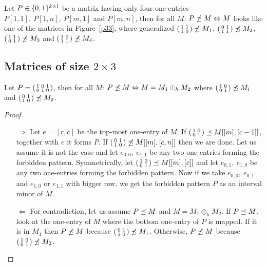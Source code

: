 \begin{thm}
Let $P\in\{0,1\}^{k\times l}$ be a matrix having only four one-entries -- $P[1,1],\ P[1,n],\ P[m,1]$ and $P[m,n]$, then for all $M$: $P\not\preceq M\Leftrightarrow M$ looks like one of the matrices in Figure~\ref{p33}, where generalized $\left(\begin{smallmatrix}1&1\\1&0\end{smallmatrix}\right)\not\preceq M_1$, $\left(\begin{smallmatrix}0&1\\1&1\end{smallmatrix}\right)\not\preceq M_2$, $\left(\begin{smallmatrix}1&1\\0&1\end{smallmatrix}\right)\not\preceq M_3$ and $\left(\begin{smallmatrix}1&0\\1&1\end{smallmatrix}\right)\not\preceq M_4$.
\end{thm}

\subsection{Matrices of size $2\times3$}
\begin{thm}
Let $P=\left(\begin{smallmatrix}1&0&1\\0&1&0\end{smallmatrix}\right)$, then for all $M$: $P\not\preceq M\Leftrightarrow M=M_1\oplus_hM_2$ where $\left(\begin{smallmatrix}1&0\\0&1\end{smallmatrix}\right)\not\preceq M_1$ and $\left(\begin{smallmatrix}0&1\\1&0\end{smallmatrix}\right)\not\preceq M_2$.
\end{thm}
\begin{proof}
\begin{itemize}
\item[$\Rightarrow$] Let $e=[r,c]$ be the top-most one-entry of $M$. If $\left(\begin{smallmatrix}1&0\\0&1\end{smallmatrix}\right)\preceq M[[m],[c-1]]$, together with $e$ it forms $P$. If $\left(\begin{smallmatrix}0&1\\1&0\end{smallmatrix}\right)\not\preceq M[[m],[c,n]]$ then we are done. Let us assume it is not the case and let $e_{0,0},\ e_{1,1}$ be any two one-entries forming the forbidden pattern. Symmetrically, let $\left(\begin{smallmatrix}1&0\\0&1\end{smallmatrix}\right)\preceq M[[m],[c]]$ and let $e_{0,1},\ e_{1,0}$ be any two one-entries forming the forbidden pattern. Now if we take $e_{0,0},\ e_{0,1}$ and $e_{1,0}$ or $e_{1,1}$ with bigger row, we get the forbidden pattern $P$ as an interval minor of $M$. 
\item[$\Leftarrow$] For contradiction, let us assume $P\preceq M$ and $M=M_1\oplus_hM_2$. If $P\preceq M$, look at the one-entry of $M$ where the bottom one-entry of $P$ is mapped. If it is in $M_1$ then $P\not\preceq M$ because $\left(\begin{smallmatrix}0&1\\1&0\end{smallmatrix}\right)\not\preceq M_1$. Otherwise, $P\not\preceq M$ because $\left(\begin{smallmatrix}1&0\\0&1\end{smallmatrix}\right)\not\preceq M_2$.
\end{itemize}
\end{proof}
